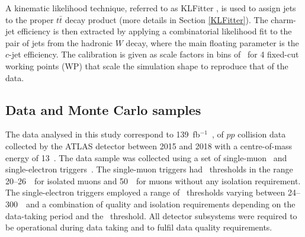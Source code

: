 \documentclass[letterpaper,12pt]{article}
\begin{document}
A kinematic likelihood technique, referred to as 
KLFitter \cite{ERDMANN201418}, is used to assign jets to the proper $t\bar{t}$ decay product 
(more details in Section \ref{KLFitter}). 
The charm-jet efficiency is then extracted by applying a combinatorial likelihood fit to the pair 
of jets from the hadronic $W$ decay, where the main floating parameter is the $c$-jet efficiency. 
The calibration is given as scale factors in bins of \pt\ for 4 fixed-cut working points (WP) 
that scale the simulation shape to reproduce that of the data.

\subsection{Data and Monte Carlo samples}

\label{sec:samples}
The data analysed in this study correspond to 139~fb$^{-1}$~\cite{DAPR-2010-01,DAPR-2011-01,DAPR-2013-01,LUCID2}, 
of \(pp\) collision data collected by the ATLAS detector between 2015 and 2018
with a centre-of-mass energy of 13~\TeV. 
The data sample was collected using a set of single-muon~\cite{Aad:2020uyd} 
and single-electron triggers~\cite{TRIG-2018-05}. The single-muon triggers 
had \pt\ thresholds in the range 20--26~\GeV\ for 
isolated muons and 50~\GeV\ for muons without any isolation requirement. 
The single-electron triggers employed a range of \pt\ thresholds 
varying between 24--300~\GeV\ 
and a combination of quality and isolation requirements depending on the 
data-taking period and the \pt\ threshold.
All detector subsystems were required to be operational
during data taking and to fulfil data quality requirements.  

\end{document}
